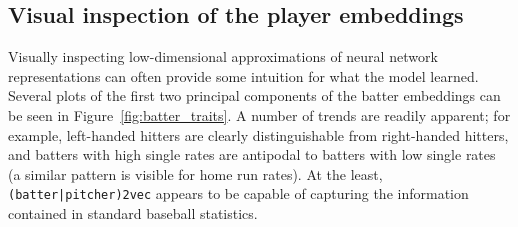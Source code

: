 \documentclass{article}
\begin{document}
\subsection{Visual inspection of the player embeddings}

Visually inspecting low-dimensional approximations of neural network representations can often provide some intuition for what the model learned. Several plots of the first two principal components of the batter embeddings can be seen in Figure~\ref{fig:batter_traits}. A number of trends are readily apparent; for example, left-handed hitters are clearly distinguishable from right-handed hitters, and batters with high single rates are antipodal to batters with low single rates (a similar pattern is visible for home run rates). At the least, \texttt{(batter|pitcher)2vec} appears to be capable of capturing the information contained in standard baseball statistics.
\end{document}
